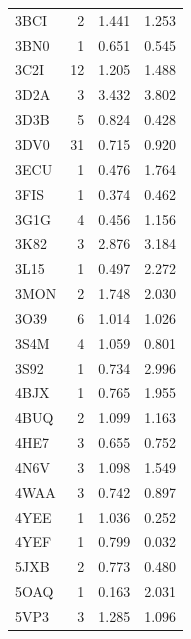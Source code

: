 \documentclass[11pt]{article}
\begin{document}
\begin{longtable}{lrrr}
3BCI & 2 & 1.441 & 1.253\\
3BN0 & 1 & 0.651 & 0.545\\
3C2I & 12 & 1.205 & 1.488\\
3D2A & 3 & 3.432 & 3.802\\
3D3B & 5 & 0.824 & 0.428\\
3DV0 & 31 & 0.715 & 0.920\\
3ECU & 1 & 0.476 & 1.764\\
3FIS & 1 & 0.374 & 0.462\\
3G1G & 4 & 0.456 & 1.156\\
3K82 & 3 & 2.876 & 3.184\\
3L15 & 1 & 0.497 & 2.272\\
3MON & 2 & 1.748 & 2.030\\
3O39 & 6 & 1.014 & 1.026\\
3S4M & 4 & 1.059 & 0.801\\
3S92 & 1 & 0.734 & 2.996\\
4BJX & 1 & 0.765 & 1.955\\
4BUQ & 2 & 1.099 & 1.163\\
4HE7 & 3 & 0.655 & 0.752\\
4N6V & 3 & 1.098 & 1.549\\
4WAA & 3 & 0.742 & 0.897\\
4YEE & 1 & 1.036 & 0.252\\
4YEF & 1 & 0.799 & 0.032\\
5JXB & 2 & 0.773 & 0.480\\
5OAQ & 1 & 0.163 & 2.031\\
5VP3 & 3 & 1.285 & 1.096\\
\hline\end{longtable}
\end{document}
